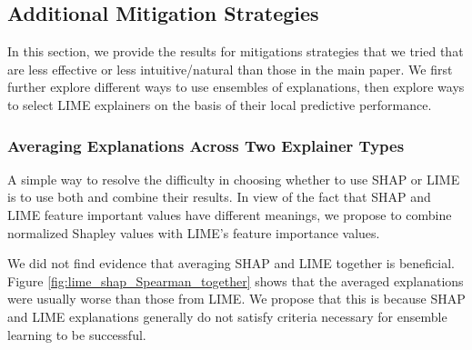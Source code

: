 \documentclass[mnsc,blindrev]{informs3}
\begin{document}
    
    
    
    \subsection{Additional Mitigation Strategies}
        \label{apx_sec:additional_mitigations}
        In this section, we provide the results for mitigations strategies that we tried that are less effective or less intuitive/natural than those in the main paper. We first further explore different ways to use ensembles of explanations, then explore ways to select LIME explainers on the basis of their local predictive performance. 
        
        \subsubsection{Averaging Explanations Across Two Explainer Types}
            \label{sec:averaging_across_explainers}
            A simple way to resolve the difficulty in choosing whether to use SHAP or LIME is to use both and combine their results. In view of the fact that SHAP and LIME feature important values have different meanings, we propose to combine normalized Shapley values with LIME's feature importance values. 

            We did not find evidence that averaging SHAP and LIME together is beneficial. Figure \ref{fig:lime_shap_Spearman_together} shows that the averaged explanations were usually worse than those from LIME. We propose that this is because SHAP and LIME explanations generally do not satisfy criteria necessary for ensemble learning to be successful.   
\end{document}
